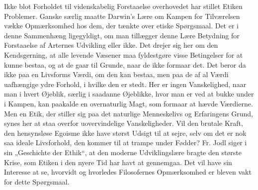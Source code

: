 \documentclass[12pt,a4paper,openany]{book}
\begin{document}
Ikke blot Forholdet til videnskabelig Forstaaelse overhovedet har
stillet Etiken Problemer. Ganske særlig maatte Darwin’s Lære om
Kampen for Tilværelsen vække Opmærksomhed hos dem, der tænkte
over etiske Spørgsmaal. Det er i denne Sammenhæng ligegyldigt, om
man tillægger denne Lære Betydning for Forstaaelse af Arternes Udvikling
eller ikke. Det drejer sig her om den Kendsgerning, at alle
levende Væsener maa fyldestgøre visse Betingelser for at kunne bestaa,
og at de gaar til Grunde, naar de ikke formaar det. Det beror
da ikke paa en Livsforms Værdi, om den kan bestaa, men paa de
af al Værdi uafhængige ydre Forhold, i hvilke den er stedt. Her er
ingen Vanskelighed, naar man i hvert Øjeblik, særlig i saadanne
Øjeblikke, hvor man er ved at bukke under i Kampen, kan paakalde
en overnaturlig Magt, som formaar at hævde Værdierne. Men
en Etik, der stiller sig paa det naturlige Menneskelivs og Erfaringens
Grund, synes her at staa overfor uovervindelige Vanskeligheder. Vil
den brutale Kraft, den hensynsløse Egoisme ikke have størst Udsigt
til at sejre, selv om det er nok saa ideale Livsforhold, den kommer
til at trampe under Fødder? Fr. Jodl siger i sin „Geschichte der
Ethik“, at den moderne Udviklingslære bragte den største Krise,
som Etiken i den nyere Tid har havt at gennemgaa. Det vil have
sin Interesse at se, hvorvidt og hvorledes Filosofernes Opmærksomhed
er bleven vakt for dette Spørgsmaal.
\end{document}
